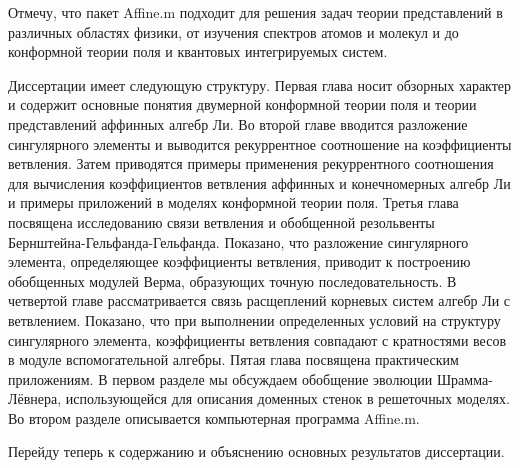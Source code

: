 \documentclass{article}
\theoremstyle{definition} \newtheorem{Def}{Определение}
\begin{document}
Отмечу, что пакет Affine.m подходит для решения задач теории представлений в различных областях физики, от изучения спектров атомов и молекул и до конформной теории поля и квантовых интегрируемых систем. 

Диссертации имеет следующую структуру. Первая глава носит обзорных характер и содержит основные понятия двумерной конформной теории поля и теории представлений аффинных алгебр Ли. 
Во второй главе вводится разложение сингулярного элементы и выводится рекуррентное соотношение на коэффициенты ветвления. Затем приводятся примеры применения рекуррентного соотношения для вычисления коэффициентов ветвления аффинных и конечномерных алгебр Ли и примеры приложений в моделях конформной теории поля. 
Третья глава посвящена исследованию связи ветвления и обобщенной резольвенты Бернштейна-Гельфанда-Гельфанда. Показано, что разложение сингулярного элемента, определяющее коэффициенты ветвления, приводит к построению обобщенных модулей Верма, образующих точную последовательность.
В четвертой главе рассматривается связь расщеплений корневых систем алгебр Ли с ветвлением. Показано, что при выполнении определенных условий на структуру сингулярного элемента, коэффициенты ветвления совпадают с кратностями весов в модуле вспомогательной алгебры. 
Пятая глава посвящена практическим приложениям. В первом разделе мы обсуждаем обобщение эволюции Шрамма-Лёвнера, использующейся для описания доменных стенок в решеточных моделях. Во втором разделе описывается компьютерная программа Affine.m. 

Перейду теперь к содержанию и объяснению основных результатов диссертации.
\end{document}
